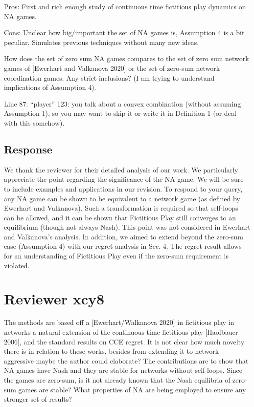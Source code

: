 \documentclass{article}
\begin{document}
	Pros: First and rich enough study of continuous time fictitious play dynamics on NA games.
	
	Cons: Unclear how big/important the set of NA games is, Assumption 4 is a bit peculiar. Simulates previous techniques without many new ideas.
	
	How does the set of zero sum NA games compares to the set of zero sum network games of [Ewerhart and Valkanova 2020] or the set of zero-sum network coordination games. Any strict inclusions? (I am trying to understand implications of Assumption 4).
	
	Line 87: “player” 123: you talk about a convex combination (without assuming Assumption 1), so you may want to skip it or write it in Definition 1 (or deal with this somehow).
	
	\subsection{Response}
	
	We thank the reviewer for their detailed analysis of our work. We particularly appreciate the point regarding the significance of the NA game. We will be sure to include examples and applications in our revision. To respond to your query, any NA game can be shown to be equivalent to a network game (as defined by Ewerhart and Valkanova). Such a transformation is required so that self-loops can be allowed, and it can be shown that Fictitious Play still converges to an equilibrium (though not always Nash). This point was not considered in Ewerhart and Valkanova's analysis. In addition, we aimed to extend beyond the zero-sum case (Assumption 4) with our regret analysis in Sec. 4. The regret result allows for an understanding of Fictitious Play even if the zero-sum requirement is violated.
	
	
	\section{Reviewer xcy8}
	
	The methods are based off a [Ewerhart/Walkanova 2020] in fictitious play in networks a natural extension of the continuous-time fictitious play [Haofbauer 2006], and the standard results on CCE regret. It is not clear how much novelty there is in relation to these works, besides from extending it to network aggressive maybe the author could elaborate? The contributions are to show that NA games have Nash and they are stable for networks without self-loops. Since the games are zero-sum, is it not already known that the Nash equilibria of zero-sum games are stable? What properties of NA are being employed to ensure any stronger set of results?
	
\end{document}
